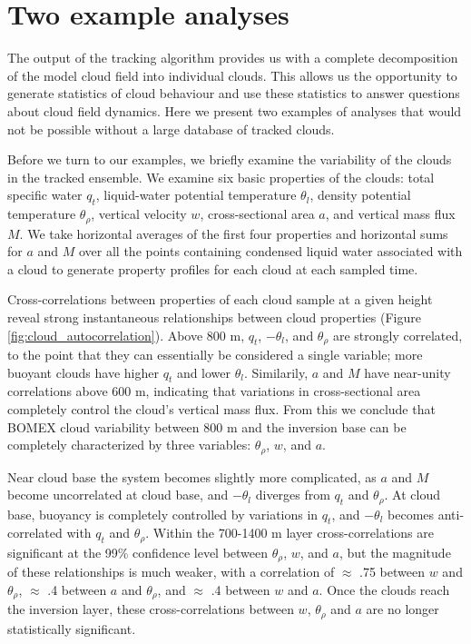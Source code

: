 \documentclass[acp]{copernicus}
\begin{document}
\section{Two example analyses}

The output of the tracking algorithm provides us with a complete decomposition 
of the model cloud field into individual clouds.  This allows us the 
opportunity to generate statistics of cloud behaviour and use these statistics 
to answer questions about cloud field dynamics.  Here we present two examples 
of analyses that would not be possible without a large database of tracked 
clouds.

Before we turn to our examples, we briefly examine the variability of the 
clouds in the tracked ensemble.  We examine six basic properties of the 
clouds: total specific water $q_t$, liquid-water potential temperature 
$\theta_l$, density potential temperature $\theta_\rho$, vertical velocity 
$w$, cross-sectional area $a$, and vertical mass flux $M$.  We take horizontal 
averages of the first four properties and horizontal sums for $a$ and $M$ over 
all the points containing condensed liquid water associated with a cloud to 
generate property profiles for each cloud at each sampled time.

Cross-correlations between properties of each cloud sample at a given height 
reveal strong instantaneous relationships between cloud properties (Figure 
\ref{fig:cloud_autocorrelation}).  Above 800 m, $q_t$, $-\theta_l$, and 
$\theta_\rho$ are strongly correlated, to the point that they can essentially 
be considered a single variable; more buoyant clouds have higher $q_t$ and 
lower $\theta_l$.  Similarily, $a$ and $M$ have near-unity correlations above 
600 m, indicating that variations in cross-sectional area completely control 
the cloud's vertical mass flux.  From this we conclude that BOMEX cloud 
variability between 800 m and the inversion base can be completely 
characterized by three variables: $\theta_\rho$, $w$, and $a$.  

Near cloud base the system becomes slightly more complicated, as $a$ and $M$ 
become uncorrelated at cloud base, and $-\theta_l$ diverges from $q_t$ and 
$\theta_\rho$.  At cloud base, buoyancy is completely controlled by 
variations in $q_t$, and $-\theta_l$ becomes anti-correlated with $q_t$ and 
$\theta_\rho$.  Within the 700-1400 m layer cross-correlations are 
significant at the 99\% confidence level between $\theta_\rho$, $w$, and $a$, 
but the magnitude of these relationships is much weaker, with a correlation of 
$\approx$ .75 between $w$ and $\theta_\rho$, $\approx$ .4 between $a$ 
and $\theta_\rho$, and $\approx$ .4 between $w$ and $a$.  Once the clouds 
reach the inversion layer, these cross-correlations between $w$, 
$\theta_\rho$ and $a$ are no longer statistically significant.
\end{document}
